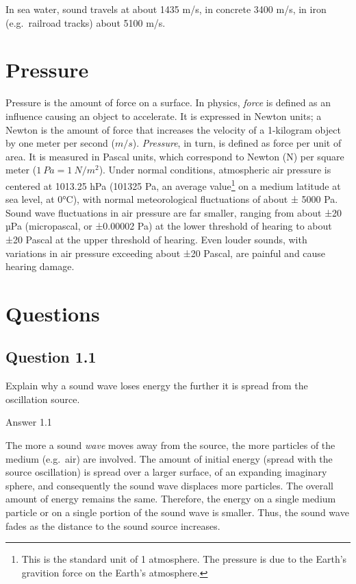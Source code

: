 \documentclass[
]{book}
\begin{document}
In sea water, sound travels at about 1435 m/s, in concrete 3400 m/s, in iron (e.g.~railroad tracks) about 5100 m/s.

\section{Pressure}\label{sec:pressure}

Pressure is the amount of force on a surface. In physics, \emph{force} is defined as an influence causing an object to accelerate. It is expressed in Newton units; a Newton is the amount of force that increases the velocity of a 1-kilogram object by one meter per second (\(m/s\)). \emph{Pressure}, in turn, is defined as force per unit of area. It is measured in Pascal units, which correspond to Newton (N) per square meter (\(1\ Pa = 1\ N/m^2\)).
Under normal conditions, atmospheric air pressure is centered at 1013.25 hPa (101325 Pa, an average value\footnote{This is the standard unit of 1 atmosphere. The pressure is due to the Earth's gravition force on the Earth's atmosphere.} on a medium latitude at sea level, at 0°C), with normal meteorological fluctuations of about ± 5000 Pa. Sound wave fluctuations in air pressure are far smaller, ranging from about ±20 µPa (micropascal, or ±0.00002 Pa) at the lower threshold of hearing to about ±20 Pascal at the upper threshold of hearing. Even louder sounds, with variations in air pressure exceeding about ±20 Pascal, are painful and cause hearing damage.

\label{questions-soundwaves}
\section*{Questions}\label{questions-1}

\subsection*{Question 1.1}\label{question-1.1}

Explain why a sound wave loses energy the further it is spread from the oscillation source.

Answer 1.1

The more a sound \emph{wave} moves away from the source, the more particles of the medium (e.g.~air) are involved. The amount of initial energy (spread with the source oscillation) is spread over a larger surface, of an expanding imaginary sphere, and consequently the sound wave displaces more particles. The overall amount of energy remains the same. Therefore, the energy on a single medium particle or on a single portion of the sound wave is smaller. Thus, the sound wave fades as the distance to the sound source increases.
\end{document}

